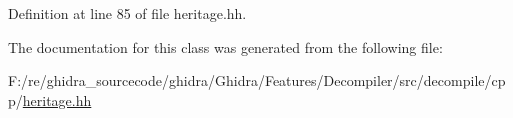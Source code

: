 Definition at line 85 of file heritage.\+hh.



The documentation for this class was generated from the following file\+:\begin{DoxyCompactItemize}
\item 
F\+:/re/ghidra\+\_\+sourcecode/ghidra/\+Ghidra/\+Features/\+Decompiler/src/decompile/cpp/\mbox{\hyperlink{heritage_8hh}{heritage.\+hh}}\end{DoxyCompactItemize}
